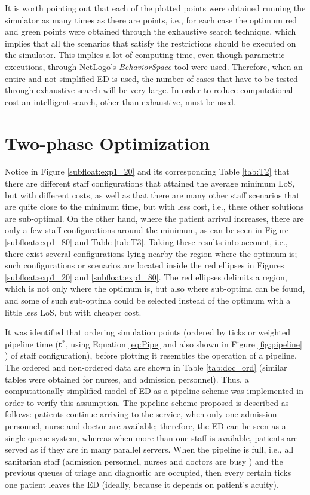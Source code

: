 \documentclass[11pt]{article} %
\begin{document}
It is worth pointing out that each of the plotted points were obtained running the simulator as many times as there are points, i.e., 
for each case the optimum red and green points were obtained through the exhaustive search technique, which implies that all the 
scenarios that satisfy the restrictions should be executed on the simulator. This implies a lot of computing time, even though 
parametric executions, through NetLogo's \emph{BehaviorSpace} tool were used. Therefore, when an entire and not simplified ED is 
used, the number of cases that have to be tested through exhaustive search will be very large. In order to reduce computational 
cost an intelligent search, other than exhaustive, must be used. 


\section {Two-phase Optimization}
\label{sec:mc_pipe}

Notice in Figure \ref{subfloat:exp1_20} and  its corresponding Table \ref{tab:T2} that there are different staff configurations that 
attained the average minimum LoS, but with different costs, as well as that there are many other staff scenarios that are quite close 
to the minimum time, but with less cost, i.e., these other solutions are sub-optimal. On the other hand, where the patient arrival 
increases, there are only a few staff configurations around the minimum, as can be seen in Figure \ref{subfloat:exp1_80} and  Table 
\ref{tab:T3}. Taking these results into account, i.e., there exist several configurations lying nearby the region where the optimum is; 
such configurations or scenarios are located inside the red ellipses in Figures \ref{subfloat:exp1_20} and  \ref{subfloat:exp1_80}. 
The red ellipses delimits a region, which is not only where the optimum is, but also where sub-optima can be found, and some of such 
sub-optima could be selected instead of the optimum with a little less LoS, but with  cheaper cost.

It was identified that ordering simulation points (ordered by ticks or weighted pipeline time ({\bf t$^*$},  using Equation 
\eqref{eq:Pipe} and also shown in Figure  \ref{fig:pipeline} ) of staff configuration), before plotting it resembles the operation of a 
pipeline. The ordered and non-ordered data are shown in Table \ref{tab:doc_ord} (similar tables were obtained for nurses, and 
admission personnel). Thus, a computationally simplified model of ED as a pipeline scheme was implemented in order to verify this 
assumption. The pipeline scheme proposed is described as follows: patients continue arriving to the service, when only one admission 
personnel, nurse and doctor are available; therefore, the ED can be seen as a single queue system, whereas when more than one 
staff is available, patients are served as if they are in many parallel servers. When the pipeline is full, i.e., all sanitarian staff 
(admission personnel, nurses and doctors are busy ) and the previous queues of triage and diagnostic are occupied, then every 
certain ticks one patient leaves the ED (ideally, because it depends on patient's acuity). 
\end{document}
